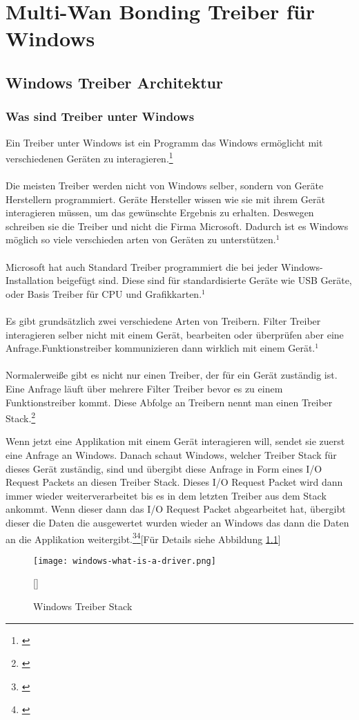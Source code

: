 \chapter{Multi-Wan Bonding Treiber für Windows}
\label{chap:Treiber}

\section{Windows Treiber Architektur}
\subsection{Was sind Treiber unter Windows}
Ein Treiber unter Windows ist ein Programm das Windows ermöglicht mit verschiedenen Geräten zu interagieren.\footnote[1]{\cite[Vgl.][]{21}}
\\\\
Die meisten Treiber werden nicht von Windows selber, sondern von Geräte Herstellern programmiert. Geräte Hersteller wissen wie sie mit ihrem Gerät interagieren müssen, um das gewünschte Ergebnis zu erhalten. Deswegen schreiben sie die Treiber und nicht die Firma Microsoft. Dadurch ist es Windows möglich so viele verschieden arten von Geräten zu unterstützen.$^{1}$
\\\\
Microsoft hat auch Standard Treiber programmiert die bei jeder Windows-Installation beigefügt sind. Diese sind für standardisierte Geräte wie USB Geräte, oder Basis Treiber für CPU und Grafikkarten.$^{1}$
\\\\
Es gibt grundsätzlich zwei verschiedene Arten von Treibern. Filter Treiber interagieren selber nicht mit einem Gerät, bearbeiten oder überprüfen aber eine Anfrage.Funktionstreiber kommunizieren dann wirklich mit einem Gerät.$^{1}$
\\\\
Normalerweiße gibt es nicht nur einen Treiber, der für ein Gerät zuständig ist. Eine Anfrage läuft über mehrere Filter Treiber bevor es zu einem Funktionstreiber kommt. Diese Abfolge an Treibern nennt man einen Treiber Stack.\footnote[2]{\cite[Vgl.][]{19}}

\newpage
\noindent
Wenn jetzt eine Applikation mit einem Gerät interagieren will, sendet sie zuerst eine Anfrage an Windows. Danach schaut Windows, welcher Treiber Stack für dieses Gerät zuständig, sind und übergibt diese Anfrage in Form eines I/O Request Packets an diesen Treiber Stack. Dieses I/O Request Packet wird dann immer wieder weiterverarbeitet bis es in dem letzten Treiber aus dem Stack ankommt. Wenn dieser dann das I/O Request Packet abgearbeitet hat, übergibt dieser die Daten die ausgewertet wurden wieder an Windows das dann die Daten an die Applikation weitergibt.\footnote[1]{\cite[Vgl.][]{19}}\footnote[2]{\cite[Vgl.][]{20}}[Für Details siehe Abbildung \ref{windows-driver-stack}]
\begin{figure}[H]
    \centering
    \texttt{[image: windows-what-is-a-driver.png]}
    \caption[Windows Treiber Stack]{Windows Treiber Stack}[\cite{20}]
    \label{windows-driver-stack} 
\end{figure}
\noindent
